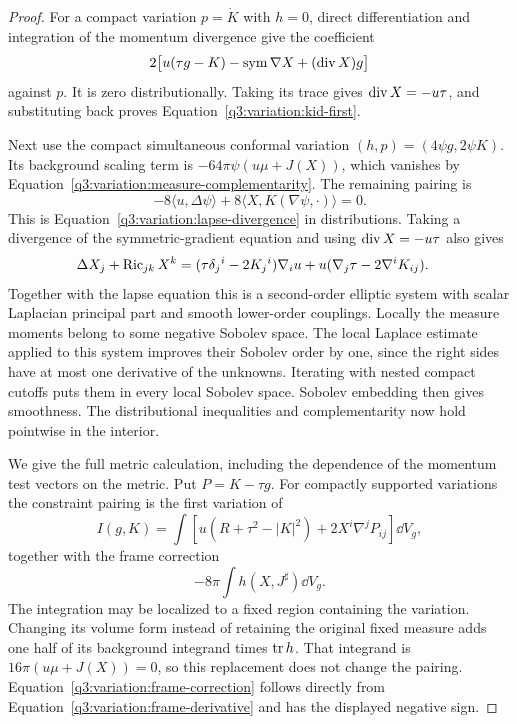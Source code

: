 \begin{proof}
For a compact variation $p=\dot K$ with $h=0$, direct differentiation
and integration of the momentum divergence give the coefficient
\[
 2\bigl[u(\tau g-K)-\operatorname{sym}\nabla X+(\operatorname{div} X)g\bigr]
\]
against $p$.  It is zero distributionally.  Taking its trace gives
$\operatorname{div} X=-u\tau$, and substituting back proves
Equation~\eqref{q3:variation:kid-first}.

Next use the compact simultaneous conformal variation
$(h,p)=(4\psi g,2\psi K)$.  Its background scaling term is
$-64\pi\psi(u\mu+J(X))$, which vanishes by
Equation~\eqref{q3:variation:measure-complementarity}.  The remaining
pairing is
\[
 -8\langle u,\Delta\psi\rangle
     +8\langle X,K(\nabla\psi,\cdot)\rangle=0.
\]
This is Equation~\eqref{q3:variation:lapse-divergence} in distributions.
Taking a divergence of the symmetric-gradient equation and using
$\operatorname{div} X=-u\tau$ also gives
\begin{equation}
 \begin{split}
  \Delta X_j+\operatorname{Ric}_{jk}X^k
    &=(\tau\delta_j{}^i-2K_j{}^i)\nabla_i u
           +u(\nabla_j\tau-2\nabla^iK_{ij}).
 \end{split}
 \label{q3:variation:elliptic-shift}
\end{equation}
Together with the lapse equation this is a second-order elliptic
system with scalar Laplacian principal part and smooth lower-order
couplings.  Locally the measure moments belong to some negative
Sobolev space.  The local Laplace estimate
\cite[Chapter~4, Section~3, Theorem~3.1, p.~127]{MelroseEllipticRegularity}
applied to this system improves their Sobolev order by one, since the
right sides have at most one derivative of the unknowns.  Iterating with
nested compact cutoffs puts them in every local Sobolev space.  Sobolev embedding
then gives smoothness.  The distributional inequalities and
complementarity now hold pointwise in the interior.

We give the full metric calculation, including the dependence of
the momentum test vectors on the metric.  Put $P=K-\tau g$.
For compactly supported variations the constraint pairing is the
first variation of
\begin{equation}
 I(g,K)=\int
  \left[u(R+\tau^2-|K|^2)+2X^i\nabla^jP_{ij}\right]\dd V_g,
 \label{q3:variation:constraint-action}
\end{equation}
together with the frame correction
\begin{equation}
 -8\pi\int h(X,J^\sharp)\dd V_g.
 \label{q3:variation:frame-correction}
\end{equation}
The integration may be localized to a fixed region containing the
variation.  Changing its volume form instead of retaining the
original fixed measure adds one half of its background integrand
times $\operatorname{tr} h$.  That integrand is $16\pi(u\mu+J(X))=0$,
so this replacement does not change the pairing.
Equation~\eqref{q3:variation:frame-correction} follows directly from
Equation~\eqref{q3:variation:frame-derivative} and has the displayed
negative sign.


\end{proof}
